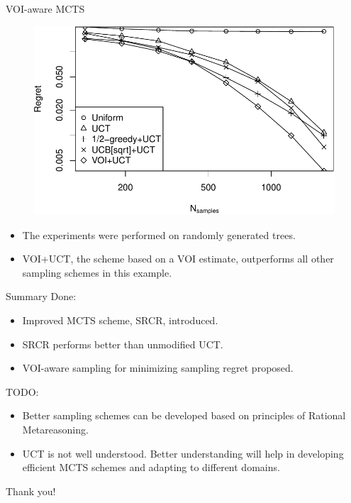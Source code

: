 \documentclass{beamer}
\begin{document}
\begin{frame}{VOI-aware MCTS}
\begin{figure}[h]
  \centering
  \includegraphics[scale=0.6]{tree-identity-k=32-uqb=8+voi.pdf}\\
\end{figure}
\begin{itemize}
\item The experiments were performed on
randomly generated trees.
\item VOI+UCT, the scheme based on a VOI estimate,
outperforms all other sampling schemes in this example.
\end{itemize}
\end{frame}

\begin{frame}{Summary}
\onslide<+->
Done:
\begin{itemize}
\item Improved MCTS scheme, SRCR, introduced.
\item SRCR performs better than unmodified UCT.
\item VOI-aware sampling for minimizing sampling regret proposed.
\end{itemize}
\onslide<+->
TODO:
\begin{itemize}
\item Better sampling schemes can be developed based on principles
  of Rational Metareasoning.
\item UCT is not well understood. Better understanding will help
  in developing efficient  MCTS schemes and adapting to different domains.
\end{itemize}
\end{frame}

\begin{frame}{}
\begin{center}
\LARGE{Thank you!}
\end{center}
\end{frame}
\end{document}
